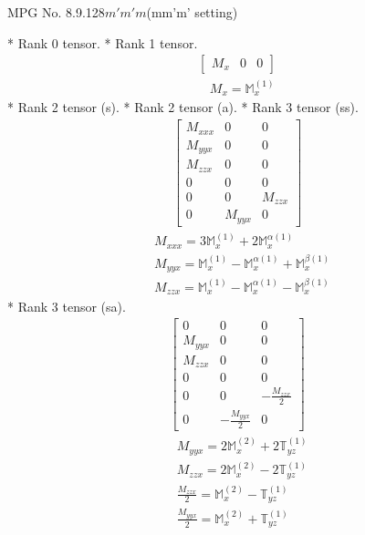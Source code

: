 \documentclass[fleqn,8pt,landscape]{jsarticle}
\begin{document}
\setcounter{MaxMatrixCols}{32}

\renewcommand{\tablename}{Table~}
\renewcommand{\figurename}{Figure~}
\begin{center}
\LARGE
MPG No. 8.9.128\quad$m'm'm$\quad(mm'm' setting)
\end{center}
* Rank 0 tensor.
* Rank 1 tensor.
\begin{align*}
\begin{bmatrix} M_{x} & 0 & 0 \end{bmatrix}
\end{align*}
\begin{align*}
& M_{x} = \mathbb{M}_{x}^{(1)}
\end{align*}
* Rank 2 tensor (s).
* Rank 2 tensor (a).
* Rank 3 tensor (ss).
\begin{align*}
\begin{bmatrix} M_{xxx} & 0 & 0 \\ M_{yyx} & 0 & 0 \\ M_{zzx} & 0 & 0 \\ 0 & 0 & 0 \\ 0 & 0 & M_{zzx} \\ 0 & M_{yyx} & 0 \end{bmatrix}
\end{align*}
\begin{align*}
& M_{xxx} = 3 \mathbb{M}_{x}^{(1)} + 2 \mathbb{M}_{x}^{\alpha(1)} \\
& M_{yyx} = \mathbb{M}_{x}^{(1)} - \mathbb{M}_{x}^{\alpha(1)} + \mathbb{M}_{x}^{\beta(1)} \\
& M_{zzx} = \mathbb{M}_{x}^{(1)} - \mathbb{M}_{x}^{\alpha(1)} - \mathbb{M}_{x}^{\beta(1)}
\end{align*}
* Rank 3 tensor (sa).
\begin{align*}
\begin{bmatrix} 0 & 0 & 0 \\ M_{yyx} & 0 & 0 \\ M_{zzx} & 0 & 0 \\ 0 & 0 & 0 \\ 0 & 0 & - \frac{M_{zzx}}{2} \\ 0 & - \frac{M_{yyx}}{2} & 0 \end{bmatrix}
\end{align*}
\begin{align*}
& M_{yyx} = 2 \mathbb{M}_{x}^{(2)} + 2 \mathbb{T}_{yz}^{(1)} \\
& M_{zzx} = 2 \mathbb{M}_{x}^{(2)} - 2 \mathbb{T}_{yz}^{(1)} \\
& \frac{M_{zzx}}{2} = \mathbb{M}_{x}^{(2)} - \mathbb{T}_{yz}^{(1)} \\
& \frac{M_{yyx}}{2} = \mathbb{M}_{x}^{(2)} + \mathbb{T}_{yz}^{(1)}
\end{align*}
\end{document}
